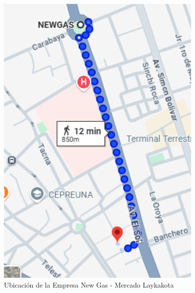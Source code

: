 \documentclass[11pt, a4paper]{article}
\begin{document}
\begin{figure}[H]
\centering
\begin{minipage}{0.48\textwidth}
  \centering
  \includegraphics[width=0.9\textwidth]{laykakota.png}
  \caption{Ubicación de la Empresa New Gas - Mercado Laykakota}
  \label{fig:laykakota}
\end{minipage}\hfill
\begin{minipage}{0.48\textwidth}
  \centering

\end{minipage}
\end{figure}
\end{document}
